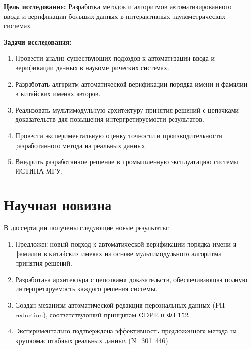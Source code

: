 \textbf{Цель исследования:}
Разработка методов и алгоритмов автоматизированного ввода и верификации больших данных в интерактивных наукометрических системах.

\textbf{Задачи исследования:}

\begin{enumerate}
    \item Провести анализ существующих подходов к автоматизации ввода и верификации данных в наукометрических системах.

    \item Разработать алгоритм автоматической верификации порядка имени и фамилии в китайских именах авторов.

    \item Реализовать мультимодульную архитектуру принятия решений с цепочками доказательств для повышения интерпретируемости результатов.

    \item Провести экспериментальную оценку точности и производительности разработанного метода на реальных данных.

    \item Внедрить разработанное решение в промышленную эксплуатацию системы ИСТИНА МГУ.
\end{enumerate}

\section{Научная новизна}
\label{sec:intro:novelty}

В диссертации получены следующие новые результаты:

\begin{enumerate}
    \item Предложен новый подход к автоматической верификации порядка имени и фамилии в китайских именах на основе мультимодульного алгоритма принятия решений.

    \item Разработана архитектура с цепочками доказательств, обеспечивающая полную интерпретируемость каждого решения системы.

    \item Создан механизм автоматической редакции персональных данных (PII redaction), соответствующий принципам GDPR и ФЗ-152.

    \item Экспериментально подтверждена эффективность предложенного метода на крупномасштабных реальных данных (N=301~446).
\end{enumerate}

